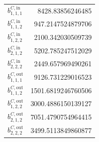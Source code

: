 \documentclass{article}%
\begin{document}
\begin{multicols*}{3}
\begin{supertabular}{lr}
	$b_{1,1,1}^{C,\text{in}}$ & 8428.83856246485 \\%
	$b_{1,1,2}^{C,\text{in}}$ & 947.2147524879706 \\%
	$b_{1,2,2}^{C,\text{in}}$ & 2100.342030509739 \\%
	$b_{2,1,2}^{C,\text{in}}$ & 5202.785247512029 \\%
	$b_{2,2,2}^{C,\text{in}}$ & 2449.657969490261 \\%
	$b_{1,1,1}^{C,\text{out}}$ & 9126.731229016523 \\%
	$b_{1,1,2}^{C,\text{out}}$ & 1501.6819246760506 \\%
	$b_{1,2,2}^{C,\text{out}}$ & 3000.4886150139127 \\%
	$b_{2,1,2}^{C,\text{out}}$ & 7051.4790754964415 \\%
	$b_{2,2,2}^{C,\text{out}}$ & 3499.5113849860877 \\%
\end{supertabular}%
\end{multicols*}%
\clearpage%
\end{document}
